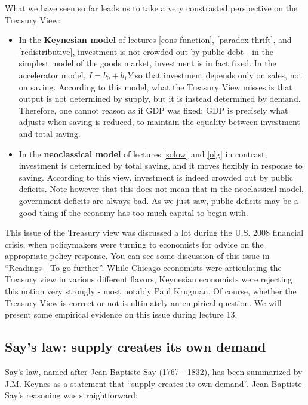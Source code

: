 \documentclass[]{book}
\theoremstyle{definition}
\theoremstyle{definition}
\theoremstyle{definition}
\theoremstyle{remark}
\begin{document}
What we have seen so far leads us to take a very constrasted perspective
on the Treasury View:

\begin{itemize}
\item
  In the \textbf{Keynesian model} of lectures \ref{cons-function},
  \ref{paradox-thrift}, and \ref{redistributive}, investment is not
  crowded out by public debt - in the simplest model of the goods
  market, investment is in fact fixed. In the accelerator model,
  \(I=b_0 + b_1 Y\) so that investment depends only on sales, not on
  saving. According to this model, what the Treasury View misses is that
  output is not determined by supply, but it is instead determined by
  demand. Therefore, one cannot reason as if GDP was fixed: GDP is
  precisely what adjusts when saving is reduced, to maintain the
  equality between investment and total saving.
\item
  In the \textbf{neoclassical model} of lectures \ref{solow} and
  \ref{olg} in contrast, investment is determined by total saving, and
  it moves flexibly in response to saving. According to this view,
  investment is indeed crowded out by public deficits. Note however that
  this does not mean that in the neoclassical model, government deficits
  are always bad. As we just saw, public deficits may be a good thing if
  the economy has too much capital to begin with.
\end{itemize}

This issue of the Treasury view was discussed a lot during the U.S. 2008
financial crisis, when policymakers were turning to economists for
advice on the appropriate policy response. You can see some discussion
of this issue in ``Readings - To go further''. While Chicago economists
were articulating the Treasury view in various different flavors,
Keynesian economists were rejecting this notion very strongly - most
notably Paul Krugman. Of course, whether the Treasury View is correct or
not is ultimately an empirical question. We will present some empirical
evidence on this issue during lecture 13.

\subsection{Say's law: supply creates its own
demand}\label{says-law-supply-creates-its-own-demand}

Say's law, named after Jean-Baptiste Say (1767 - 1832), has been
summarized by J.M. Keynes as a statement that ``supply creates its own
demand''. Jean-Baptiste Say's reasoning was straightforward:
\end{document}
